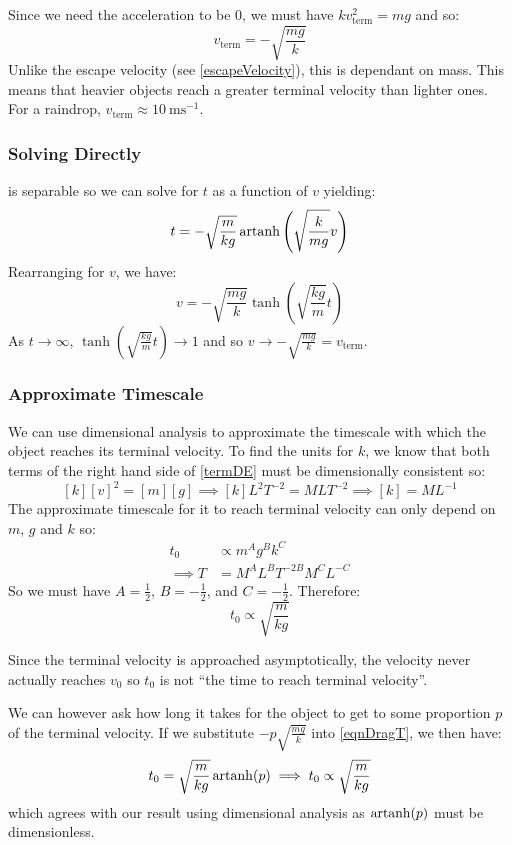 \documentclass[../main.tex]{subfiles}
\begin{document}
Since we need the acceleration to be 0, we must have $kv^2_{\text{term}} = mg$ and so:
\[
  v_{\text{term}} = - \sqrt{\frac{mg}{k}}
\]
Unlike the escape velocity (see \cref{escapeVelocity}), this is dependant on mass.
This means that heavier objects reach a greater terminal velocity than lighter ones.
For a raindrop, $v_{\text{term}} \approx \qty{10}{\metre\second^{-1}}$.

\subsubsection{Solving Directly}
 is separable so we can solve for $t$ as a function of $v$ yielding:
\begin{equation}
  t = -\sqrt{\frac{m}{kg}}\operatorname{artanh}\left(\sqrt{\frac{k}{mg}}v\right) \label{eqnDragT}
\end{equation}
Rearranging for $v$, we have:
\[
  v = -\sqrt{\frac{mg}{k}}\tanh\left(\sqrt{\frac{kg}{m}}t\right)
\]
As $t \to \infty$, $\tanh\left(\sqrt{\frac{kg}{m}}t\right) \to 1$ and so $v \to -\sqrt{\frac{mg}{k}} = v_{\text{term}}$.
\subsubsection{Approximate Timescale}
We can use dimensional analysis to approximate the timescale with which the object reaches its terminal velocity.
To find the units for $k$, we know that both terms of the right hand side of \cref{termDE} must be dimensionally consistent so:
\[
  [k][v]^2 = [m][g] \implies [k]L^2T^{-2} = MLT^{-2} \implies [k] = ML^{-1}
\]
The approximate timescale for it to reach terminal velocity can only depend on $m$, $g$ and $k$ so:
\begin{align*}
  t_0 &\propto m^{A}g^{B}k^{C} \\
  \implies T &= M^{A}L^{B}T^{-2B}M^{C}L^{-C}
\end{align*}
So we must have $A = \frac{1}{2}$, $B = -\frac{1}{2}$, and $C = -\frac{1}{2}$.
Therefore:
\[
  t_0 \propto \sqrt{\frac{m}{kg}}
\]
\begin{remark}
  Since the terminal velocity is approached asymptotically, the velocity never actually reaches $v_0$ so $t_0$ is not ``the time to reach terminal velocity''.

  We can however ask how long it takes for the object to get to some proportion $p$ of the terminal velocity.
  If we substitute $-p \sqrt{\frac{mg}{k}}$ into \cref{eqnDragT}, we then have:
  \[
   t_0 = \sqrt{\frac{m}{kg}}\operatorname{artanh}(p) \implies t_0 \propto \sqrt{\frac{m}{kg}}
  \]
  which agrees with our result using dimensional analysis as $\operatorname{artanh}(p)$ must be dimensionless.
\end{remark}
\end{document}
